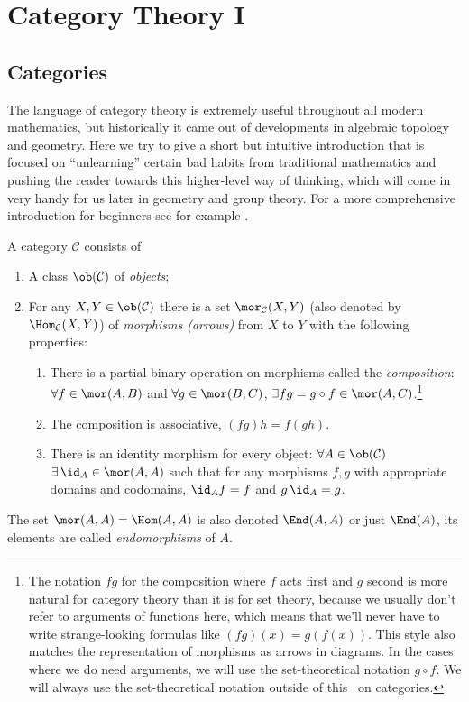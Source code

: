 \chapter{Category Theory I}


\section{Categories}

The language of category theory is extremely useful throughout all modern mathematics, but historically it came out of developments in algebraic topology and geometry. Here we try to give a short but intuitive introduction that is focused on ``unlearning'' certain bad habits from traditional mathematics and pushing the reader towards this higher-level way of thinking, which will come in very handy for us later in geometry and group theory. For a more comprehensive introduction for beginners see for example \cite{Leinster, Perrone}.


\begin{defn}[Categories]
    A category $\mathcal{C}$ consists of
    \begin{enumerate}
    \item A class $\ob(\mathcal{C})$ of \emph{objects};
    \item For any $X,Y\in\ob(\mathcal{C})$ there is a set $\mor_{\mathcal{C}}(X,Y)$ (also denoted by $\Hom_{\mathcal{C}}(X,Y)$) of \emph{morphisms (arrows)}  from $X$ to $Y$ with the following properties:
    \begin{enumerate}
    \item There is a partial binary operation on morphisms called the \emph{composition}: $\forall f\in\mor(A,B)$
    and $\forall g\in\mor(B,C)$, $\exists fg=g\circ f\in\mor(A,C)$.\footnote{The notation $fg$ for the composition where $f$ acts first and $g$ second is more natural for category theory than it is for set theory, because we usually don't refer to arguments of functions here, which means that we'll never have to write strange-looking formulas like $(fg)(x)=g(f(x))$. This style also matches the representation of morphisms as arrows in diagrams. In the cases where we do need arguments, we will use the set-theoretical notation $g\circ f$. We will always use the set-theoretical notation outside of this \chap\ on categories.}
    \item The composition is associative, $\left(fg\right)h=f\left(gh\right)$.
    \item There is an identity morphism for every object: $\forall A\in\ob(\mathcal{C})$
    $\exists\,\id_{A}\in\mor(A,A)$ such that for any morphisms $f,g$ with
    appropriate domains and codomains, $\id_{A}f=f$ and $g\,\id_{A}=g$.
    \end{enumerate}
    \end{enumerate}
    The set $\mor(A,A)=\Hom(A,A)$ is also denoted $\End(A,A)$ or just $\End(A)$, its elements are called \emph{endomorphisms} of $A$.
\end{defn}

